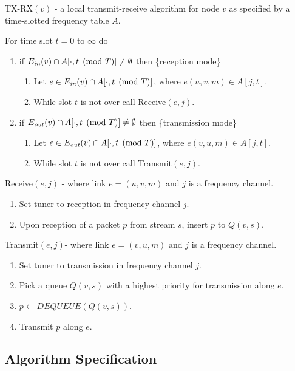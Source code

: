 \documentclass[12pt]{article}
\newenvironment{proof sketch}[1]{\noindent {\emph{Proof sketch of #1:}}}{\hfill \qed}
\newcommand{\Ein}{E_{\text{\emph{in}}}}
\newcommand{\Eout}{E_{\text{\emph{out}}}}
\begin{document}
\begin{algorithm}
  \caption{TX-RX$(v)$ - a local transmit-receive algorithm for node
    $v$ as specified by a time-slotted frequency table $A$.}
\label{alg:tx-rx}
For time slot $t=0$ to $\infty$ do
  \begin{enumerate}%
  \item if $\Ein(v)\cap A[\cdot,t \pmod T]\neq \emptyset$ then
    \{reception mode\}
    \begin{enumerate}%
    \item Let $e\in \Ein(v)\cap A[\cdot,t\pmod T]$, where $e(u,v,m)\in
      A[j,t]$.
    \item While slot $t$ is not over call Receive$(e,j)$.
    \end{enumerate}%
  \item if $\Eout(v)\cap A[\cdot,t \pmod T]\neq \emptyset$ then
    \{transmission mode\}
    \begin{enumerate}%
    \item Let $e\in \Eout(v)\cap A[\cdot,t \pmod T]$, where
      $e(v,u,m)\in A[j,t]$.
    \item While slot $t$ is not over call Transmit$(e,j)$.
    \end{enumerate}%
  \end{enumerate}%
Receive$(e,j)$ - where link $e=(u,v,m)$ and $j$ is a frequency channel.
\begin{enumerate}
\item Set tuner to reception in frequency channel $j$.
\item Upon reception of a packet $p$ from stream $s$, insert $p$ to $Q(v,s)$.
\end{enumerate}

Transmit$(e,j)$-  where link $e=(v,u,m)$ and $j$ is a frequency channel.
\begin{enumerate}
\item Set tuner to transmission in frequency channel $j$.
\item\label{line:priority} Pick a queue $Q(v,s)$ with a highest priority for transmission along $e$.
\item $p \gets DEQUEUE(Q(v,s))$.
\item Transmit $p$ along $e$.
\end{enumerate}
\end{algorithm}

\subsection{Algorithm Specification}
\end{document}
